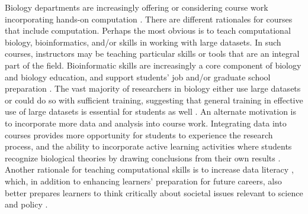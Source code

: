 
Biology departments are increasingly offering or considering course work incorporating hands-on computation
\citep{WilsonSayres18}. 
There are different rationales for courses that include computation.
Perhaps the most obvious is to teach computational biology, bioinformatics,
and/or skills in working with large datasets.
In such courses, instructors may be teaching particular skills or tools that are an integral part of the field.
Bioinformatic skills are increasingly a core component of biology and biology education, and 
support students' job and/or graduate school preparation \citep{WilsonSayres18}. 
The vast majority of researchers in biology either use large datasets or could do so with sufficient training, suggesting that general training in effective use of large datasets is essential for students as well \citep{Barone17,Loman13}.
An alternate motivation is to incorporate more data and analysis into course work.
Integrating data into courses provides more opportunity for students to experience the research process, and the ability to incorporate active learning activities where
students recognize biological theories by drawing conclusions from their own results
\citep{Kjelvik19}.
Another rationale for teaching computational skills is to increase data literacy \citep{Gibson18}, which, in addition to enhancing learners' preparation for future careers, also better prepares learners to think critically about societal issues relevant to science and policy \citep{cook2014}.

